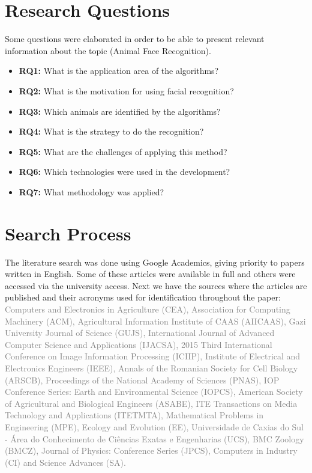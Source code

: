 \documentclass[alpha-refs,english]{RBCA_v3.0}
\begin{document}
\section{Research Questions}
Some questions were elaborated in order to be able to present relevant information about the topic (Animal Face Recognition).
\begin{itemize}
	\item \textbf{RQ1:} What is the application area of the algorithms?
	\item \textbf{RQ2:} What is the motivation for using facial recognition?
	\item \textbf{RQ3:} Which animals are identified by the algorithms?

	\item \textbf{RQ4:} What is the strategy to do the recognition?
	\item \textbf{RQ5:} What are the challenges of applying this method?
	\item \textbf{RQ6:} Which technologies were used in the development?
	\item \textbf{RQ7:} What methodology was applied?
\end{itemize}

\section{Search Process}
The literature search was done using Google Academics, giving priority to papers written in English. Some of these articles were available in full and others were accessed via the university access. Next we have the sources where the articles are published and their acronyms used for identification throughout the paper: \textcolor{gray}{Computers and Electronics in Agriculture (CEA), Association for Computing Machinery (ACM), Agricultural Information Institute of CAAS (AIICAAS), Gazi University Journal of Science (GUJS), International Journal of Advanced Computer Science and Applications (IJACSA), 2015 Third International Conference on Image Information Processing (ICIIP), Institute of Electrical and Electronics Engineers (IEEE), Annals of the Romanian Society for Cell Biology (ARSCB), Proceedings of the National Academy of Sciences (PNAS), IOP Conference Series: Earth and Environmental Science (IOPCS), American Society of Agricultural and Biological Engineers (ASABE), ITE Transactions on Media Technology and Applications (ITETMTA), Mathematical Problems in Engineering (MPE), Ecology and Evolution (EE), Universidade de Caxias do Sul - Área do Conhecimento de Ciências Exatas e Engenharias (UCS), BMC Zoology (BMCZ), Journal of Physics: Conference Series (JPCS), Computers in Industry (CI) and Science Advances (SA).}
\end{document}
